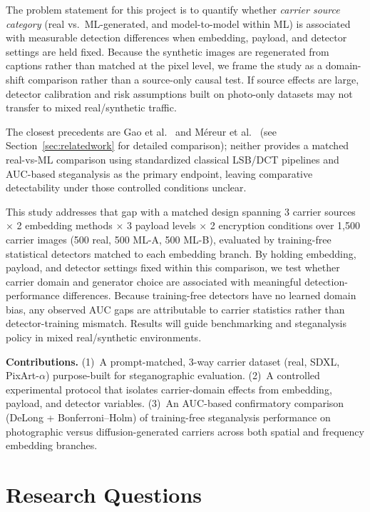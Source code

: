 \documentclass[10pt,twocolumn,a4paper]{article}
\begin{document}
The problem statement for this project is to quantify whether \emph{carrier source category} (real vs.\ ML-generated, and model-to-model within ML) is associated with measurable detection differences when embedding, payload, and detector settings are held fixed. Because the synthetic images are regenerated from captions rather than matched at the pixel level, we frame the study as a domain-shift comparison rather than a source-only causal test. If source effects are large, detector calibration and risk assumptions built on photo-only datasets may not transfer to mixed real/synthetic traffic.

The closest precedents are Gao et al.~\cite{gao2022ai} and M\'{e}reur et al.~\cite{mereur2024deepfake} (see Section~\ref{sec:relatedwork} for detailed comparison); neither provides a matched real-vs-ML comparison using standardized classical LSB/DCT pipelines and AUC-based steganalysis as the primary endpoint, leaving comparative detectability under those controlled conditions unclear.

This study addresses that gap with a matched design spanning 3 carrier sources $\times$ 2 embedding methods $\times$ 3 payload levels $\times$ 2 encryption conditions over 1{,}500 carrier images (500 real, 500 ML-A, 500 ML-B), evaluated by training-free statistical detectors matched to each embedding branch. By holding embedding, payload, and detector settings fixed within this comparison, we test whether carrier domain and generator choice are associated with meaningful detection-performance differences. Because training-free detectors have no learned domain bias, any observed AUC gaps are attributable to carrier statistics rather than detector-training mismatch. Results will guide benchmarking and steganalysis policy in mixed real/synthetic environments.

\smallskip
\noindent\textbf{Contributions.} (1)~A prompt-matched, 3-way carrier dataset (real, SDXL, PixArt-$\alpha$) purpose-built for steganographic evaluation. (2)~A controlled experimental protocol that isolates carrier-domain effects from embedding, payload, and detector variables. (3)~An AUC-based confirmatory comparison (DeLong + Bonferroni--Holm) of training-free steganalysis performance on photographic versus diffusion-generated carriers across both spatial and frequency embedding branches.

\section{Research Questions}
\end{document}
